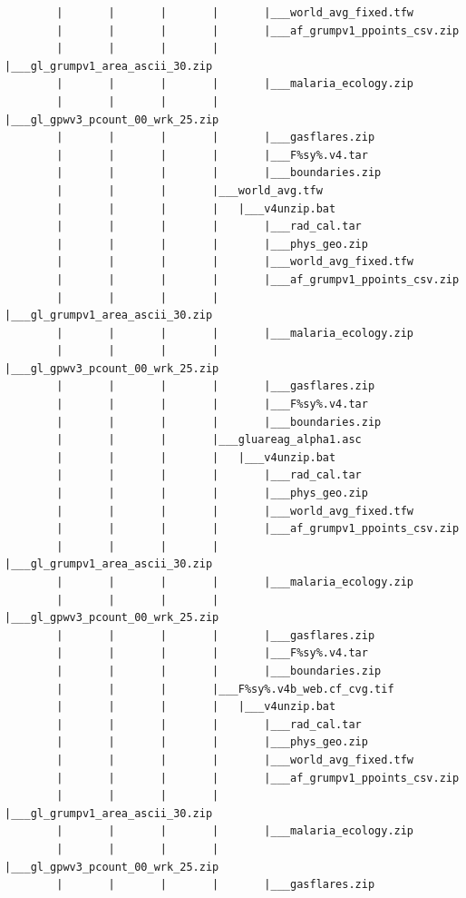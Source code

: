 \documentclass[]{book}
\begin{document}
\begin{verbatim}
        |       |       |       |       |___world_avg_fixed.tfw
        |       |       |       |       |___af_grumpv1_ppoints_csv.zip
        |       |       |       |       |___gl_grumpv1_area_ascii_30.zip
        |       |       |       |       |___malaria_ecology.zip
        |       |       |       |       |___gl_gpwv3_pcount_00_wrk_25.zip
        |       |       |       |       |___gasflares.zip
        |       |       |       |       |___F%sy%.v4.tar
        |       |       |       |       |___boundaries.zip
        |       |       |       |___world_avg.tfw
        |       |       |       |   |___v4unzip.bat
        |       |       |       |       |___rad_cal.tar
        |       |       |       |       |___phys_geo.zip
        |       |       |       |       |___world_avg_fixed.tfw
        |       |       |       |       |___af_grumpv1_ppoints_csv.zip
        |       |       |       |       |___gl_grumpv1_area_ascii_30.zip
        |       |       |       |       |___malaria_ecology.zip
        |       |       |       |       |___gl_gpwv3_pcount_00_wrk_25.zip
        |       |       |       |       |___gasflares.zip
        |       |       |       |       |___F%sy%.v4.tar
        |       |       |       |       |___boundaries.zip
        |       |       |       |___gluareag_alpha1.asc
        |       |       |       |   |___v4unzip.bat
        |       |       |       |       |___rad_cal.tar
        |       |       |       |       |___phys_geo.zip
        |       |       |       |       |___world_avg_fixed.tfw
        |       |       |       |       |___af_grumpv1_ppoints_csv.zip
        |       |       |       |       |___gl_grumpv1_area_ascii_30.zip
        |       |       |       |       |___malaria_ecology.zip
        |       |       |       |       |___gl_gpwv3_pcount_00_wrk_25.zip
        |       |       |       |       |___gasflares.zip
        |       |       |       |       |___F%sy%.v4.tar
        |       |       |       |       |___boundaries.zip
        |       |       |       |___F%sy%.v4b_web.cf_cvg.tif
        |       |       |       |   |___v4unzip.bat
        |       |       |       |       |___rad_cal.tar
        |       |       |       |       |___phys_geo.zip
        |       |       |       |       |___world_avg_fixed.tfw
        |       |       |       |       |___af_grumpv1_ppoints_csv.zip
        |       |       |       |       |___gl_grumpv1_area_ascii_30.zip
        |       |       |       |       |___malaria_ecology.zip
        |       |       |       |       |___gl_gpwv3_pcount_00_wrk_25.zip
        |       |       |       |       |___gasflares.zip

\end{verbatim}
\end{document}
